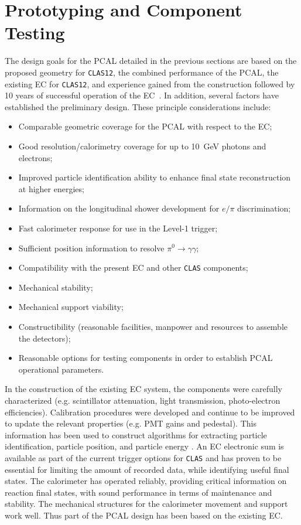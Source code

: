 \section{Prototyping and Component Testing}

The design goals for the PCAL detailed in the previous sections are based 
on the proposed geometry for {\tt CLAS12}, the combined performance of the 
PCAL, the existing EC for {\tt CLAS12}, and experience gained from the 
construction followed by 10 years of successful operation of the EC~\cite{ec}. 
In addition, several factors have established the preliminary design.
These principle considerations include: 

\begin{itemize}
\item Comparable geometric coverage for the PCAL with respect to the EC;
\item Good resolution/calorimetry coverage for up to 10~GeV photons and 
electrons;
\item Improved particle identification ability to enhance final state
reconstruction at higher energies; 
\item Information on the longitudinal shower development for $e/\pi$
discrimination;
\item Fast calorimeter response for use in the Level-1 trigger;
\item Sufficient position information to resolve $\pi^0 \to \gamma \gamma$; 
\item Compatibility with the present EC and other {\tt CLAS} components;
\item Mechanical stability;
\item Mechanical support viability;
\item Constructibility (reasonable facilities, manpower and resources
to assemble the detectors); 
\item Reasonable options for testing components in order to establish
PCAL operational parameters. 
\end{itemize}

In the construction of the existing EC system, the components were 
carefully characterized (e.g. scintillator attenuation, light transmission, 
photo-electron efficiencies). Calibration procedures were developed and 
continue to be improved to update the relevant properties (e.g. PMT gains 
and pedestal).  This information has been used to construct algorithms for 
extracting particle identification, particle position, and particle energy 
\cite{ecrec}.  An EC electronic sum is available as part of the current 
trigger options for {\tt CLAS} and has proven to be essential for limiting 
the amount of recorded data, while identifying useful final states.  The 
calorimeter has operated reliably, providing critical information on reaction 
final states, with sound performance in terms of maintenance and stability. 
The mechanical structures for the calorimeter movement and support work well. 
Thus part of the PCAL design has been based on the existing EC.

